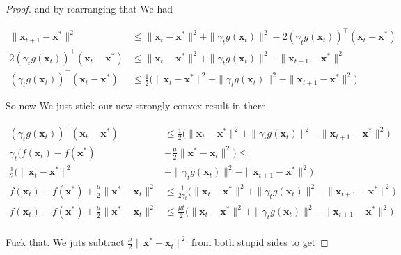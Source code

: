 \documentclass{article}
\begin{document}
\begin{proof}
			and by rearranging that We had
			
			\begin{align*}
				\|\mathbf{x}_{t+1} - \mathbf{x}^* \|^2 &\le \| \mathbf{x}_t - \mathbf{x}^* \|^2  + \|\gamma_t g(\mathbf{x}_t) \|^2 - 2(\gamma_t g(\mathbf{x}_t))^\top ( \mathbf{x}_t - \mathbf{x}^*)\\
				 2(\gamma_t g(\mathbf{x}_t))^\top ( \mathbf{x}_t - \mathbf{x}^*)&\le \| \mathbf{x}_t - \mathbf{x}^* \|^2  + \|\gamma_t g(\mathbf{x}_t) \|^2  - \|\mathbf{x}_{t+1} - \mathbf{x}^* \|^2\\
				(\gamma_t g(\mathbf{x}_t))^\top ( \mathbf{x}_t - \mathbf{x}^*)&\le\frac{1}{2}\big( \| \mathbf{x}_t - \mathbf{x}^* \|^2  + \|\gamma_t g(\mathbf{x}_t) \|^2  - \|\mathbf{x}_{t+1} - \mathbf{x}^* \|^2 \big)
			\end{align*}
			
			So now We just stick our new strongly convex result in there
			
			\begin{align*}
				(\gamma_t g(\mathbf{x}_t))^\top ( \mathbf{x}_t - \mathbf{x}^*)&\le\frac{1}{2}\big( \| \mathbf{x}_t - \mathbf{x}^* \|^2  + \|\gamma_t g(\mathbf{x}_t) \|^2  - \|\mathbf{x}_{t+1} - \mathbf{x}^* \|^2 \big)\\
				\gamma_t\big(f(\mathbf{x}_t) - f(\mathbf{x}^*)  &+ \frac{\mu}{2} \|\mathbf{x}^*- \mathbf{x}_t\|^2 \big) \le\\
				\frac{1}{2}\big( \| \mathbf{x}_t - \mathbf{x}^* \|^2  &+ \|\gamma_t g(\mathbf{x}_t) \|^2  - \|\mathbf{x}_{t+1} - \mathbf{x}^* \|^2 \big)\\
				f(\mathbf{x}_t) - f(\mathbf{x}^*)  + \frac{\mu}{2} \|\mathbf{x}^*- \mathbf{x}_t\|^2  &\le \frac{1}{2\gamma_t}\big( \| \mathbf{x}_t - \mathbf{x}^* \|^2  + \|\gamma_t g(\mathbf{x}_t) \|^2  - \|\mathbf{x}_{t+1} - \mathbf{x}^* \|^2 \big)\\
				f(\mathbf{x}_t) - f(\mathbf{x}^*)  + \frac{\mu}{2} \|\mathbf{x}^*- \mathbf{x}_t\|^2  &\le \frac{\mu t}{2}\big( \| \mathbf{x}_t - \mathbf{x}^* \|^2  + \|\gamma_t g(\mathbf{x}_t) \|^2  - \|\mathbf{x}_{t+1} - \mathbf{x}^* \|^2 \big)\\
			\end{align*}
			
			Fuck that. We juts subtract $\frac{\mu}{2} \|\mathbf{x}^*- \mathbf{x}_t\|^2 $ from both stupid sides to get 
			

\end{proof}
\end{document}
